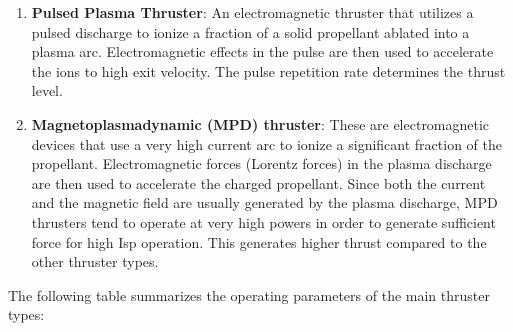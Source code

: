 \documentclass[11pt]{article}
\begin{document}
\begin{enumerate}
\item \textbf{Pulsed Plasma Thruster}: An electromagnetic thruster that utilizes a pulsed discharge to ionize a fraction of a solid propellant ablated into a plasma arc. Electromagnetic effects in the pulse are then used to accelerate the ions to high exit velocity. The pulse repetition rate determines the thrust level.

\item \textbf{Magnetoplasmadynamic (MPD) thruster}: These are electromagnetic devices that use a very high current arc to ionize a significant fraction of the propellant. Electromagnetic forces (Lorentz forces) in the plasma discharge are then used to accelerate the charged propellant. Since both the current and the magnetic field are usually generated by the plasma discharge, MPD thrusters tend to operate at very high powers in order to generate sufficient force for high Isp operation.  This generates higher thrust compared to the other thruster types.

\end{enumerate}


The following table summarizes the operating parameters of the main thruster types:
\end{document}
